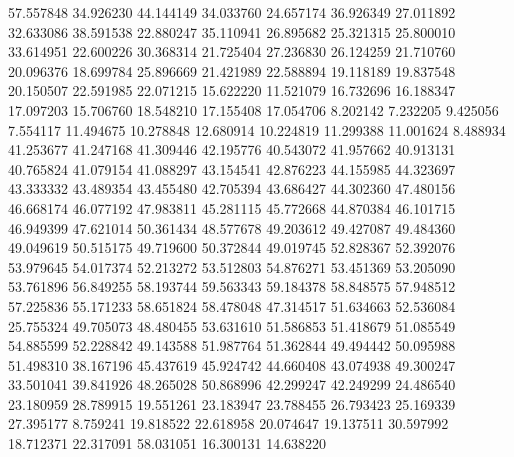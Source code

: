 57.557848
34.926230
44.144149
34.033760
24.657174
36.926349
27.011892
32.633086
38.591538
22.880247
35.110941
26.895682
25.321315
25.800010
33.614951
22.600226
30.368314
21.725404
27.236830
26.124259
21.710760
20.096376
18.699784
25.896669
21.421989
22.588894
19.118189
19.837548
20.150507
22.591985
22.071215
15.622220
11.521079
16.732696
16.188347
17.097203
15.706760
18.548210
17.155408
17.054706
8.202142
7.232205
9.425056
7.554117
11.494675
10.278848
12.680914
10.224819
11.299388
11.001624
8.488934
41.253677
41.247168
41.309446
42.195776
40.543072
41.957662
40.913131
40.765824
41.079154
41.088297
43.154541
42.876223
44.155985
44.323697
43.333332
43.489354
43.455480
42.705394
43.686427
44.302360
47.480156
46.668174
46.077192
47.983811
45.281115
45.772668
44.870384
46.101715
46.949399
47.621014
50.361434
48.577678
49.203612
49.427087
49.484360
49.049619
50.515175
49.719600
50.372844
49.019745
52.828367
52.392076
53.979645
54.017374
52.213272
53.512803
54.876271
53.451369
53.205090
53.761896
56.849255
58.193744
59.563343
59.184378
58.848575
57.948512
57.225836
55.171233
58.651824
58.478048
47.314517
51.634663
52.536084
25.755324
49.705073
48.480455
53.631610
51.586853
51.418679
51.085549
54.885599
52.228842
49.143588
51.987764
51.362844
49.494442
50.095988
51.498310
38.167196
45.437619
45.924742
44.660408
43.074938
49.300247
33.501041
39.841926
48.265028
50.868996
42.299247
42.249299
24.486540
23.180959
28.789915
19.551261
23.183947
23.788455
26.793423
25.169339
27.395177
8.759241
19.818522
22.618958
20.074647
19.137511
30.597992
18.712371
22.317091
58.031051
16.300131
14.638220